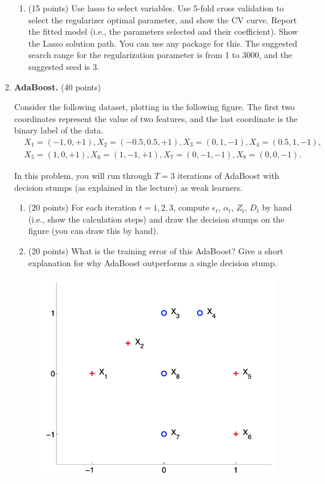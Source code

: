 \documentclass[twoside,10pt]{article}
\begin{document}
\begin{enumerate}
\begin{enumerate}
\item (15 points) Use lasso to select variables. Use 5-fold cross validation to select the regularizer optimal parameter, and show the CV curve.  Report the fitted model (i.e., the parameters selected and their coefficient). Show the Lasso solution path. You can use any package for this. The suggested search range for the regularization parameter is from 1 to 3000, and the suggested seed is 3.

\end{enumerate}

\clearpage


\item  {\bf AdaBoost.} (40 points)

Consider the following dataset, plotting in the following figure. The first two coordinates represent the value of two features, and the last coordinate is the binary label of the data.
\begin{equation*}
\begin{split}
&X_1 = (-1, 0, +1), X_2 = (-0.5, 0.5, +1), X_3 = (0, 1, -1), X_4 = (0.5, 1, -1), \\
&X_5 = (1, 0, +1), X_6 = (1, -1, +1), X_7 = (0, -1, -1), X_8 = (0, 0, -1).
\end{split}
\end{equation*}

In this problem, you will run through $T = 3$ iterations of AdaBoost with decision stumps (as explained in the lecture) as weak learners.

\begin{enumerate}
\item (20 points) For each iteration $t = 1, 2, 3$, compute $\epsilon_t$, $\alpha_t$, $Z_t$, $D_t$ by hand (i.e., show the calculation steps) and draw the decision stumps on the figure (you can draw this by hand). 

\item (20 points) What is the training error of this AdaBoost? Give a short explanation for why AdaBoost outperforms a single decision stump.

\end{enumerate}


\begin{figure}[h!]
\begin{center}
\includegraphics[width =.4 \textwidth]{hw}
\end{center}
\end{figure}
\vspace{-.3in}


\end{enumerate}
\end{document}
